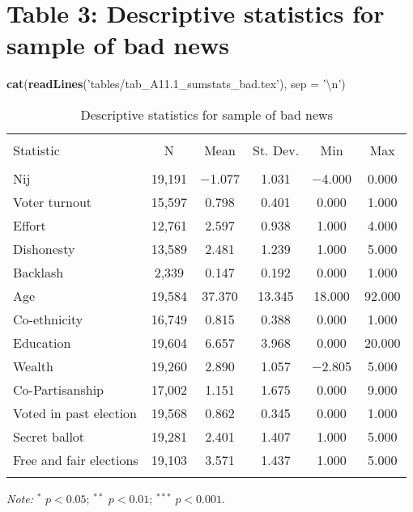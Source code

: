 \documentclass[]{article}
\newenvironment{Shaded}{\begin{snugshade}}{\end{snugshade}}
\newcommand{\KeywordTok}[1]{\textcolor[rgb]{0.13,0.29,0.53}{\textbf{{#1}}}}
\newcommand{\DataTypeTok}[1]{\textcolor[rgb]{0.13,0.29,0.53}{{#1}}}
\newcommand{\CharTok}[1]{\textcolor[rgb]{0.31,0.60,0.02}{{#1}}}
\newcommand{\StringTok}[1]{\textcolor[rgb]{0.31,0.60,0.02}{{#1}}}
\newcommand{\NormalTok}[1]{{#1}}
\begin{document}
\section{Table 3: Descriptive statistics for sample of bad
news}\label{table-3-descriptive-statistics-for-sample-of-bad-news}

\begin{Shaded}
\begin{Highlighting}[]
\KeywordTok{cat}\NormalTok{(}\KeywordTok{readLines}\NormalTok{(}\StringTok{'tables/tab_A11.1_sumstats_bad.tex'}\NormalTok{), }\DataTypeTok{sep =} \StringTok{'}\CharTok{\textbackslash{}n}\StringTok{'}\NormalTok{)}
\end{Highlighting}
\end{Shaded}

\begin{table}[htb] \centering 
  \caption{Descriptive statistics for sample of bad news} 
  \label{} 
\begin{tabular}{@{\extracolsep{1pt}}lccccc} 
\\[-1.8ex]\hline 
\hline \\[-1.8ex] 
Statistic & \multicolumn{1}{c}{N} & \multicolumn{1}{c}{Mean} & \multicolumn{1}{c}{St. Dev.} & \multicolumn{1}{c}{Min} & \multicolumn{1}{c}{Max} \\ 
\hline \\[-1.8ex] 
Nij & 19,191 & $-$1.077 & 1.031 & $-$4.000 & 0.000 \\ 
Voter turnout & 15,597 & 0.798 & 0.401 & 0.000 & 1.000 \\ 
Effort & 12,761 & 2.597 & 0.938 & 1.000 & 4.000 \\ 
Dishonesty & 13,589 & 2.481 & 1.239 & 1.000 & 5.000 \\ 
Backlash & 2,339 & 0.147 & 0.192 & 0.000 & 1.000 \\ 
Age & 19,584 & 37.370 & 13.345 & 18.000 & 92.000 \\ 
Co-ethnicity & 16,749 & 0.815 & 0.388 & 0.000 & 1.000 \\ 
Education & 19,604 & 6.657 & 3.968 & 0.000 & 20.000 \\ 
Wealth & 19,260 & 2.890 & 1.057 & $-$2.805 & 5.000 \\ 
Co-Partisanship & 17,002 & 1.151 & 1.675 & 0.000 & 9.000 \\ 
Voted in past election & 19,568 & 0.862 & 0.345 & 0.000 & 1.000 \\ 
Secret ballot & 19,281 & 2.401 & 1.407 & 1.000 & 5.000 \\ 
Free and fair elections & 19,103 & 3.571 & 1.437 & 1.000 & 5.000 \\ 
\hline \\[-1.8ex] 
\end{tabular} 
\begin{flushleft}\textit{Note:}  $^*$ $p<0.05$; $^{**}$ $p<0.01$; $^{***}$ $p<0.001$. \end{flushleft}
\end{table}
\end{document}
